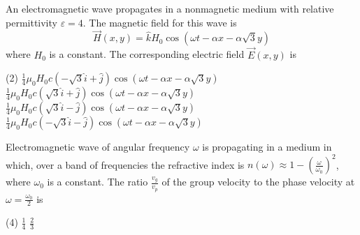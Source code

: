 \begin{enumerate}
\begin{minipage}{\textwidth}
	\item An electromagnetic wave propagates in a nonmagnetic medium with relative permittivity $\varepsilon=4$. The magnetic field for this wave is
	$$
	\vec{H}(x, y)=\hat{k} H_{0} \cos (\omega t-\alpha x-\alpha \sqrt{3} y)
	$$
	where $H_{0}$ is a constant. The corresponding electric field $\vec{E}(x, y)$ is
\end{minipage}
\begin{tasks}(2)
	\task[\textbf{A.}] $\frac{1}{4} \mu_{0} H_{0} c(-\sqrt{3} \hat{i}+\hat{j}) \cos (\omega t-\alpha x-\alpha \sqrt{3} y)$ 
	\task[\textbf{B.}] $\frac{1}{4} \mu_{0} H_{0} c(\sqrt{3} \hat{i}+\hat{j}) \cos (\omega t-\alpha x-\alpha \sqrt{3} y)$
	\task[\textbf{C.}]$\frac{1}{4} \mu_{0} H_{0} c(\sqrt{3} \hat{i}-\hat{j}) \cos (\omega t-\alpha x-\alpha \sqrt{3} y)$
	\task[\textbf{D.}]$\frac{1}{4} \mu_{0} H_{0} c(-\sqrt{3} \hat{i}-\hat{j}) \cos (\omega t-\alpha x-\alpha \sqrt{3} y)$
\end{tasks}
\begin{minipage}{\textwidth}
	\item Electromagnetic wave of angular frequency $\omega$ is propagating in a medium in which, over a band of frequencies the refractive index is $n(\omega) \approx 1-\left(\frac{\omega}{\omega_{0}}\right)^{2}$, where $\omega_{0}$ is a constant. The ratio $\frac{v_{g}}{v_{p}}$ of the group velocity to the phase velocity at $\omega=\frac{\omega_{0}}{2}$ is
\end{minipage}
\begin{tasks}(4)
	\task[\textbf{B.}]$\frac{1}{4}$
	\task[\textbf{C.}]$\frac{2}{3}$
\end{tasks}

\end{enumerate}


